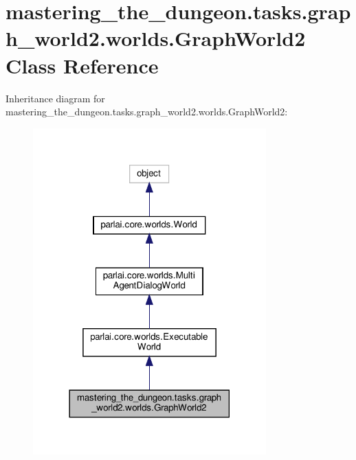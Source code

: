 \hypertarget{classmastering__the__dungeon_1_1tasks_1_1graph__world2_1_1worlds_1_1GraphWorld2}{}\section{mastering\+\_\+the\+\_\+dungeon.\+tasks.\+graph\+\_\+world2.\+worlds.\+Graph\+World2 Class Reference}
\label{classmastering__the__dungeon_1_1tasks_1_1graph__world2_1_1worlds_1_1GraphWorld2}


Inheritance diagram for mastering\+\_\+the\+\_\+dungeon.\+tasks.\+graph\+\_\+world2.\+worlds.\+Graph\+World2\+:
\nopagebreak
\begin{figure}[H]
\begin{center}
\leavevmode
\includegraphics[width=254pt]{classmastering__the__dungeon_1_1tasks_1_1graph__world2_1_1worlds_1_1GraphWorld2__inherit__graph}
\end{center}
\end{figure}


